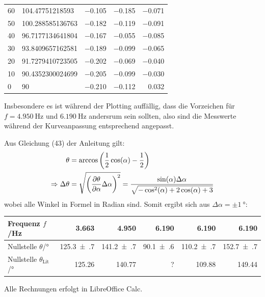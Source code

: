 \begin{center}
\begin{tabular}{llrrr}
				\num{60} & \num{104,47751218593} & \num{-0,105} & \num{-0,185} & \num{-0,071} \\
				\num{50} & \num{100,288585136763} & \num{-0,182} & \num{-0,119} & \num{-0,091} \\
				\num{40} & \num{96,7177134641804} & \num{-0,167} & \num{-0,055} & \num{-0,085} \\
				\num{30} & \num{93,8409657162581} & \num{-0,189} & \num{-0,099} & \num{-0,065} \\
				\num{20} & \num{91,7279410723505} & \num{-0,202} & \num{-0,069} & \num{-0,040} \\
				\num{10} & \num{90,4352300024699} & \num{-0,205} & \num{-0,099} & \num{-0,030} \\
				\num{0} & \num{90} & \num{-0,210} & \num{-0,112} & \num{0,032} \\
				\bottomrule
			\end{tabular}
		\end{center}		
		Insbesondere es ist während der Plotting auffällig, dass die Vorzeichen für $f = \SI{4.950}{\hertz}$ und $\SI{6.190}{\hertz}$ andersrum sein sollten, also sind die Messwerte während der Kurveanpassung entsprechend angepasst. 

		Aus Gleichung (43) der Anleitung gilt:
		\begin{align}
			\theta &= \arccos\left(\frac{1}{2}\cos(\alpha) - \frac{1}{2}\right) \\
			\Rightarrow \Delta \theta &= \gausserror{\theta}{\alpha} = \frac{\sin(\alpha)\Delta \alpha}{\sqrt{-\cos^2(\alpha) + 2 \cos(\alpha) + 3}}
		\end{align}
		wobei alle Winkel in Formel in Radian sind. Somit ergibt sich aus $\Delta\alpha = \pm\SI{1}{\degree}$:
		\begin{center}
			\begin{tabular}{l|r|r|rrr}
				\toprule
				Frequenz $f$/\si{\hertz} & \num{3.663} & \num{4.950} & \num{6.190} & \num{6.190} & \num{6.190} \\
				\midrule
				Nullstelle $\theta$/\si{\degree} & \num{125.3(7)} & \num{141.2(7)} & \num{90.1(6)} & \num{110.2(7)} & \num{152.7(7)} \\
				Nullstelle $\theta_\text{Lit}$/\si{\degree} & \num{125.26} & \num{140.77} & ? & \num{109.88} & \num{149.44} \\
				\bottomrule				
			\end{tabular}
		\end{center}
		Alle Rechnungen erfolgt in LibreOffice Calc. 

